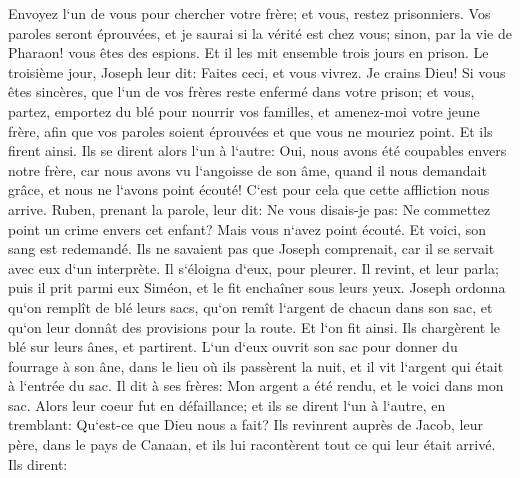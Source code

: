 \verse Envoyez l`un de vous pour chercher votre frère; et vous, restez prisonniers. Vos paroles seront éprouvées, et je saurai si la vérité est chez vous; sinon, par la vie de Pharaon! vous êtes des espions. 
\verse Et il les mit ensemble trois jours en prison. 
\verse Le troisième jour, Joseph leur dit: Faites ceci, et vous vivrez. Je crains Dieu! 
\verse Si vous êtes sincères, que l`un de vos frères reste enfermé dans votre prison; et vous, partez, emportez du blé pour nourrir vos familles, 
\verse et amenez-moi votre jeune frère, afin que vos paroles soient éprouvées et que vous ne mouriez point. Et ils firent ainsi. 
\verse Ils se dirent alors l`un à l`autre: Oui, nous avons été coupables envers notre frère, car nous avons vu l`angoisse de son âme, quand il nous demandait grâce, et nous ne l`avons point écouté! C`est pour cela que cette affliction nous arrive. 
\verse Ruben, prenant la parole, leur dit: Ne vous disais-je pas: Ne commettez point un crime envers cet enfant? Mais vous n`avez point écouté. Et voici, son sang est redemandé. 
\verse Ils ne savaient pas que Joseph comprenait, car il se servait avec eux d`un interprète. 
\verse Il s`éloigna d`eux, pour pleurer. Il revint, et leur parla; puis il prit parmi eux Siméon, et le fit enchaîner sous leurs yeux. 
\verse Joseph ordonna qu`on remplît de blé leurs sacs, qu`on remît l`argent de chacun dans son sac, et qu`on leur donnât des provisions pour la route. Et l`on fit ainsi. 
\verse Ils chargèrent le blé sur leurs ânes, et partirent. 
\verse L`un d`eux ouvrit son sac pour donner du fourrage à son âne, dans le lieu où ils passèrent la nuit, et il vit l`argent qui était à l`entrée du sac. 
\verse Il dit à ses frères: Mon argent a été rendu, et le voici dans mon sac. Alors leur coeur fut en défaillance; et ils se dirent l`un à l`autre, en tremblant: Qu`est-ce que Dieu nous a fait? 
\verse Ils revinrent auprès de Jacob, leur père, dans le pays de Canaan, et ils lui racontèrent tout ce qui leur était arrivé. Ils dirent: 
